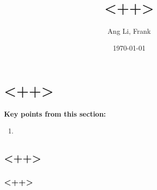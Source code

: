 \documentclass[11pt, a4paper, openany]{book}
\title{\textbf{<++>}}
\author{Ang Li, Frank}
\date{\today}
\begin{document}
\newcommand{\head}[1]{\textnormal{\textbf{#1}}}

\fancyhf{}
\renewcommand{\headrulewidth}{2pt}
\renewcommand{\footrulewidth}{1pt}
\fancyhead[LE]{\leftmark}
\fancyhead[RO]{\nouppercase{\rightmark}}
\fancyfoot[LE,RO]{\thepage}

\maketitle
\tableofcontents

\chapter{<++>}

\begin{tcolorbox}
\textbf{Key points from this section:}
\begin{enumerate}\itemsep0em
	\item <++>
\end{enumerate}
\end{tcolorbox}

\section{<++>}

\subsection{<++>}
\end{document}
